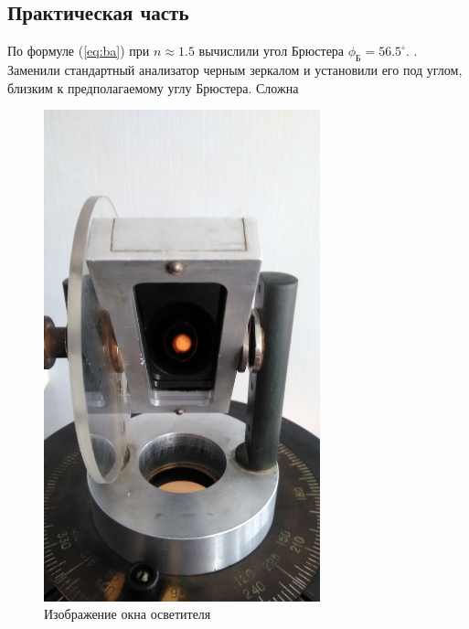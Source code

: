 \subsection{Практическая часть}

По формуле (\ref{eq:ba}) при $n\approx1.5$ вычислили угол Брюстера $\phi_{\text{Б}}=56.5^{\circ}$. . Заменили стандартный анализатор черным зеркалом и установили его под углом, близким к предполагаемому углу Брюстера.  
Сложна

\begin{figure}[H]
	\centering
	\includegraphics[width=8cm]{pic/b1.jpg}
	\caption{Изображение окна осветителя}
	\label{fig:figure3}
\end{figure}

